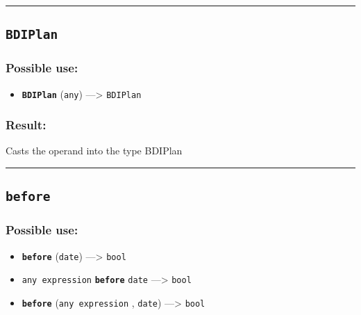 \documentclass[]{book}
\providecommand{\tightlist}{%
  \setlength{\itemsep}{0pt}\setlength{\parskip}{0pt}}
\theoremstyle{definition}
\theoremstyle{definition}
\theoremstyle{definition}
\theoremstyle{remark}
\begin{document}
\begin{center}\rule{0.5\linewidth}{\linethickness}\end{center}

\subsection{\texorpdfstring{\texttt{BDIPlan}}{BDIPlan}}\label{bdiplan}

\subsubsection{Possible use:}\label{possible-use-63}

\begin{itemize}
\tightlist
\item
  \textbf{\texttt{BDIPlan}} (\texttt{any}) ---\textgreater{}
  \texttt{BDIPlan}
\end{itemize}

\subsubsection{Result:}\label{result-62}

Casts the operand into the type BDIPlan

\begin{center}\rule{0.5\linewidth}{\linethickness}\end{center}

\subsection{\texorpdfstring{\texttt{before}}{before}}\label{before}

\subsubsection{Possible use:}\label{possible-use-64}

\begin{itemize}
\tightlist
\item
  \textbf{\texttt{before}} (\texttt{date}) ---\textgreater{}
  \texttt{bool}
\item
  \texttt{any\ expression} \textbf{\texttt{before}} \texttt{date}
  ---\textgreater{} \texttt{bool}
\item
  \textbf{\texttt{before}} (\texttt{any\ expression} , \texttt{date})
  ---\textgreater{} \texttt{bool}
\end{itemize}
\end{document}
